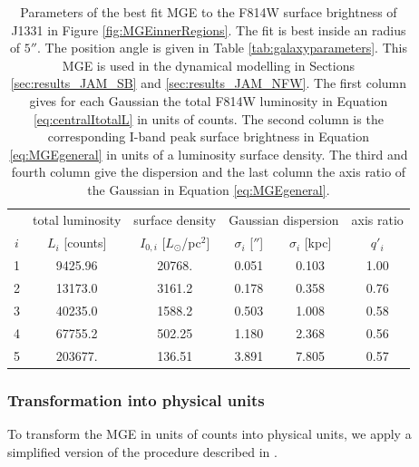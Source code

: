 \documentclass[useAMS,usenatbib]{mnras}
\begin{document}
\begin{table}
\centering
\caption{Parameters of the best fit MGE to the F814W surface brightness of J1331 in Figure \ref{fig:MGEinnerRegions}. The fit is best inside an radius of $5''$. The position angle is given in Table \ref{tab:galaxyparameters}. This MGE is used in the dynamical modelling in Sections \ref{sec:results_JAM_SB} and \ref{sec:results_JAM_NFW}. The first column gives for each Gaussian the total F814W luminosity in Equation \eqref{eq:centralItotalL} in units of counts. The second column is the corresponding I-band peak surface brightness in Equation \eqref{eq:MGEgeneral} in units of a luminosity surface density. The third and fourth column give the dispersion and the last column the axis ratio of the Gaussian in Equation \eqref{eq:MGEgeneral}.}
\begin{tabular}{cccccc}
\hline
 & total luminosity  & surface density & \multicolumn{2}{c}{Gaussian dispersion} & axis ratio\\
$i$  & $L_i$ [counts] & $I_{0,i}$ [$L_\odot$/pc$^2$] & $\sigma_i$ [$''$] & $\sigma_i$ [kpc] & $q'_i$\\\hline
1  &     9425.96 &      20768.  &  0.051   & 0.103  & 1.00\\
2  &    13173.0 &        3161.2 &  0.178   & 0.358  & 0.76\\
3  &    40235.0 &        1588.2 &  0.503   & 1.008  & 0.58\\
4  &    67755.2 &         502.25&  1.180   & 2.368  & 0.56\\
5  &    203677. &         136.51&  3.891   & 7.805  & 0.57\\\hline
\end{tabular}
\label{tab:MGEF814W}
\end{table}

\subsubsection{Transformation into physical units}

To transform the MGE in units of counts into physical units, we apply a simplified version of the procedure described in \citet{Holtzman}.
\end{document}
